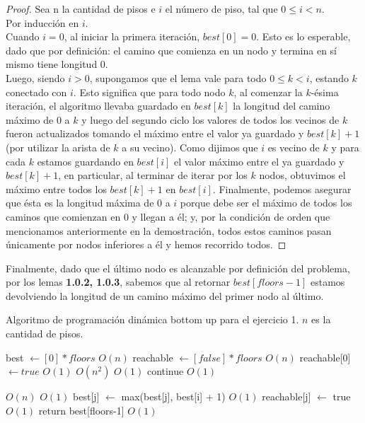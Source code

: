 \documentclass{article}
\theoremstyle{definition}
\theoremstyle{remark}
\begin{document}
\begin{proof}
Sea n la cantidad de pisos e $i$ el número de piso, tal que $0 \leq i < n$. \\
Por inducción en $i$. \\

Cuando $i = 0$, al iniciar la primera iteración, $best[0] = 0$. Esto es lo esperable, dado que por definición: el camino que comienza en un nodo y termina en sí mismo tiene longitud 0. \\

Luego, siendo $i > 0$, supongamos que el lema vale para todo $0 \leq k < i$, estando $k$ conectado con $i$. Esto significa que para todo nodo $k$, al comenzar la $k$-ésima iteración, el algoritmo llevaba guardado en $best[k]$ la longitud del camino máximo de $0$ a $k$ y luego del segundo ciclo los valores de todos los vecinos de $k$ fueron actualizados tomando el máximo entre el valor ya guardado y $best[k]+1$ (por utilizar la arista de $k$ a su vecino). Como dijimos que $i$ es vecino de $k$ y para cada $k$ estamos guardando en $best[i]$ el valor máximo entre el ya guardado y $best[k]+1$, en particular, al terminar de iterar por los $k$ nodos, obtuvimos el máximo entre todos los $best[k]+1$ en $best[i]$. Finalmente, podemos asegurar que ésta es la longitud máxima de $0$ a $i$ porque debe ser el máximo de todos los caminos que comienzan en 0 y llegan a él; y, por la condición de orden que mencionamos anteriormente en la demostración, todos estos caminos pasan únicamente por nodos inferiores a él y hemos recorrido todos.
\end{proof}

Finalmente, dado que el último nodo es alcanzable por definición del problema, por los lemas \textbf{1.0.2, 1.0.3}, sabemos que al retornar $best[floors-1]$ estamos devolviendo la longitud de un camino máximo del primer nodo al último.

\begin{algorithm}[h!]
\caption{Algoritmo de programación dinámica bottom up para el ejercicio 1. $n$ es la cantidad de pisos.\label{alg:ex1}}

\begin{algorithmic}[h!]
\State best $\gets [0] * floors$ \Comment $O(n)$
\State reachable $\gets [false] * floors$ \Comment $O(n)$
\State reachable[0] $\gets true$ \Comment $O(1)$
 \Comment $O(n^2)$
     \Comment $O(1)$
        \State continue \Comment $O(1)$
    \EndIf
    
     \Comment $O(n)$
         \Comment $O(1)$
            \State best[j] $\gets$ max(best[j], best[i] + 1) \Comment $O(1)$
            \State reachable[j] $\gets$ true \Comment $O(1)$
        \EndIf    
    \EndFor
\EndFor
\State return best[floors-1] \Comment $O(1)$
\EndProcedure\\
\end{algorithmic}
\end{algorithm}
\end{document}
